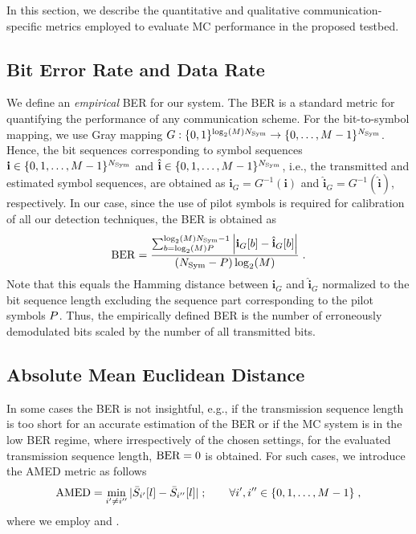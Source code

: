 In this section, we describe the quantitative and qualitative communication-specific metrics employed to evaluate \ac{MC} performance in the proposed testbed.
\vspace{0.1cm}
\scaleSubsection
\subsection{Bit Error Rate and Data Rate}\label{sec:ber_and_data_rate}
\scaleSubsectionBelow
%
We define an \textit{empirical} \ac{BER} for our system. The \ac{BER} is a standard metric for quantifying the performance of any communication scheme. For the bit-to-symbol mapping, we use Gray mapping \cite[p. 100]{proakis2008digital} $G: \{0,1\}^{\log_{2}(M)N_{\mathrm{Sym}}} \rightarrow \{0, \ldots, M - 1\}^{N_{\mathrm{Sym}}}$. Hence, the bit sequences corresponding to symbol sequences $\mathbf{i} \in \{0, 1, \ldots , M - 1\}^{N_{\mathrm{Sym}}}$ and $\hat{\mathbf{i}} \in \{0, 1, \ldots , M - 1\}^{N_{\mathrm{Sym}}}$, i.e., the transmitted and estimated symbol sequences, are obtained as $\mathbf{i}_{G} = G^{-1}(\mathbf{i})$ and $\hat{\mathbf{i}}_G = G^{-1}(\hat{\mathbf{i}})$, respectively. In our case, since the use of pilot symbols is required for calibration of all our detection techniques, the \ac{BER} is obtained as
%
\begin{equation}
    \mathrm{BER} = \frac{\sum_{b = \log_2(M)P}^{\log_{2}(M)N_{\mathrm{Sym}} - 1} \left|\mathbf{i}_{G}[b] - \hat{\mathbf{i}}_G[b]\right|}{(N_{\mathrm{Sym}} - P)\log_2(M)}\;.
    \label{eq:BER}
\end{equation}
Note that this equals the Hamming distance between $\mathbf{i}_{G}$ and $\hat{\mathbf{i}}_G$ normalized to the bit sequence length excluding the sequence part corresponding to the pilot symbols $P$. Thus, the empirically defined \ac{BER} is the number of erroneously demodulated bits scaled by the number of all transmitted bits.
\vspace{0.1cm}
\scaleSubsection
\subsection{Absolute Mean Euclidean Distance}
\scaleSubsectionBelow
%
In some cases the \ac{BER} is not insightful, e.g., if the transmission sequence length is too short for an accurate estimation of the \ac{BER} or if the \ac{MC} system is in the low \ac{BER} regime, where irrespectively of the chosen settings, for the evaluated transmission sequence length, $\textnormal{BER}=0$ is obtained.
For such cases, we introduce the \ac{AMED} metric as follows
\begin{equation}
   \mathrm{AMED} = \min_{i' \neq i''} |\Bar{S}_{i'}[l] - \Bar{S}_{i''}[l]| \;; \qquad \forall i', i'' \in \{0, 1, \ldots, M - 1\} \;,
    \label{eq:amed}
\end{equation}
where we employ  and .

